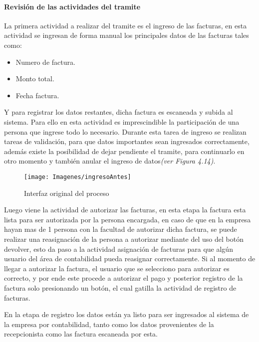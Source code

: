 		
		\paragraph{Revisión de las actividades del tramite}
		La primera actividad a realizar del tramite es el ingreso de las facturas, en esta actividad se ingresan de forma manual los principales datos de las facturas tales como:
		
		\begin{itemize}
			\item Numero de factura.
			\item Monto total.
			\item Fecha factura.
		\end{itemize}
		
		Y para registrar los datos restantes, dicha factura es escaneada y subida al sistema. Para ello en esta actividad es imprescindible la participación de una persona que ingrese todo lo necesario. Durante esta tarea de ingreso se realizan tareas de validación, para que datos importantes sean ingresados correctamente, además existe la posibilidad de dejar pendiente el tramite, para continuarlo en otro momento y también anular el ingreso de datos\textit{(ver Figura 4.14)}.

		\begin{figure}[H]
			\texttt{[image: Imagenes/ingresoAntes]}
			\caption{Interfaz original del proceso}
		\end{figure}
		
		 Luego viene la actividad de autorizar las facturas, en esta etapa la factura esta lista para ser autorizada por la persona encargada, en caso de que en la empresa hayan mas de 1 persona con la facultad de autorizar dicha factura, se puede realizar una reasignación de la persona a autorizar mediante del uso del botón devolver, esto da paso a la actividad asignación de facturas para que algún usuario del área de contabilidad pueda reasignar correctamente. Si al momento de llegar a autorizar la factura, el usuario que se selecciono para autorizar es correcto, y por ende este procede a autorizar el pago y posterior registro de la factura solo presionando un botón, el cual gatilla la actividad de registro de facturas. 
		 \newline
		 \par
		 En la etapa de registro los datos están ya listo para ser ingresados al sistema de la empresa por contabilidad, tanto como los datos provenientes de la recepcionista como las factura escaneada por esta.
		
